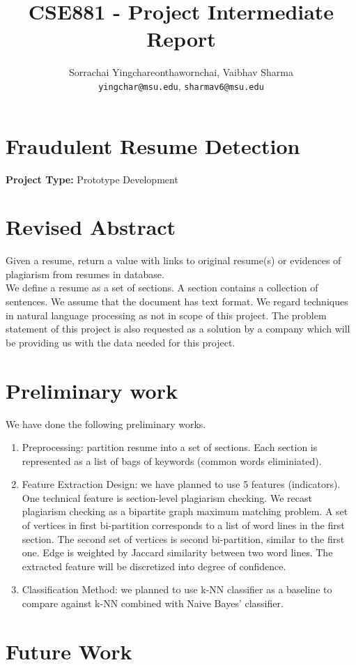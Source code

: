 \documentclass{article}
\title{CSE881 - Project Intermediate Report}
\author{Sorrachai Yingchareonthawornchai, Vaibhav Sharma \\
 \texttt{yingchar@msu.edu}, \texttt{sharmav6@msu.edu}\\
}
\begin{document}
\maketitle

\section*{ Fraudulent Resume Detection }
\textbf{Project Type:} Prototype Development

\section{Revised Abstract} Given a resume, return a value with links to original resume(s) or evidences of plagiarism from resumes in database. \\
We define a resume as a set of sections. A section contains a collection of sentences. We assume that the document has text format. We regard techniques in natural language processing as not in scope of this project. The problem statement of this project is also requested as a solution by a company which will be providing us with the data needed for this project.

\section{Preliminary work}
We have done the following preliminary works.
\begin{enumerate}
\item Preprocessing: partition resume into a set of sections. Each
  section is represented as a list of bags of keywords (common words eliminiated).
\item Feature Extraction Design: we have planned to use 5 features
  (indicators). One technical feature is section-level plagiarism checking. We recast
  plagiarism checking as a bipartite graph maximum matching problem.  A
  set of vertices in first bi-partition corresponds to a list of word
  lines in the first section. The second set of vertices is second
  bi-partition, similar to
  the first one. Edge is weighted by Jaccard similarity between two
  word lines. The extracted feature will be discretized into degree of
  confidence. 
\item Classification Method: we planned to use k-NN classifier as a baseline
  to compare against k-NN combined with Naive Bayes' classifier.
\end{enumerate}

\section{Future Work}
\end{document}
